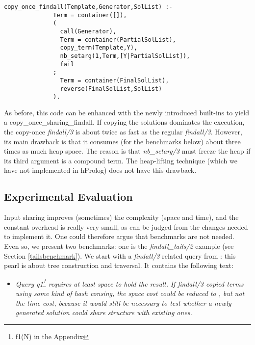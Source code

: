 \documentclass{tlp}
\begin{document}
\begin{Verbatim}[fontsize=\small, frame=single,samepage=true]
       copy_once_findall(Template,Generator,SolList) :-
              Term = container([]),
              (
                call(Generator),
                Term = container(PartialSolList),
                copy_term(Template,Y),
                nb_setarg(1,Term,[Y|PartialSolList]),
                fail
              ;
                Term = container(FinalSolList),
                reverse(FinalSolList,SolList)
              ).
\end{Verbatim}

As before, this code can be enhanced with the newly introduced
built-ins to yield a copy\_once\_sharing\_findall. If copying the
solutions dominates the execution, the copy-once {\em findall/3} is about
twice as fast as the regular {\em findall/3}. However, its main drawback is
that it consumes (for the benchmarks below) about three times as much
heap space. The reason is that {\em nb\_setarg/3} must freeze the heap
if its third argument is a compound term. The heap-lifting technique
(which we have not implemented in hProlog) does not have this
drawback.



\subsection{Experimental Evaluation}

Input sharing improves (sometimes) the complexity (space and time),
and the constant overhead is really very small, as can be judged from
the changes needed to implement it. One could therefore argue that
benchmarks are not needed. Even so, we present two benchmarks: one is
the {\em findall\_tails/2} example (see Section \ref{tailsbenchmark}). We
start with a {\em findall/3} related query from \cite{OKeefePearl}: this
pearl is about tree construction and traversal. It contains the
following text:

\begin{itemize}
\item[]
{\em Query q1\footnote{f1(N) in the Appendix} requires at least
   space to hold the result.}  {\em If findall/3 copied terms
  using some kind of hash consing, the space cost could be reduced to
  , but not the time cost, because it would still be necessary
  to test whether a newly generated solution could share structure
  with existing ones.}
\end{itemize}
\end{document}
